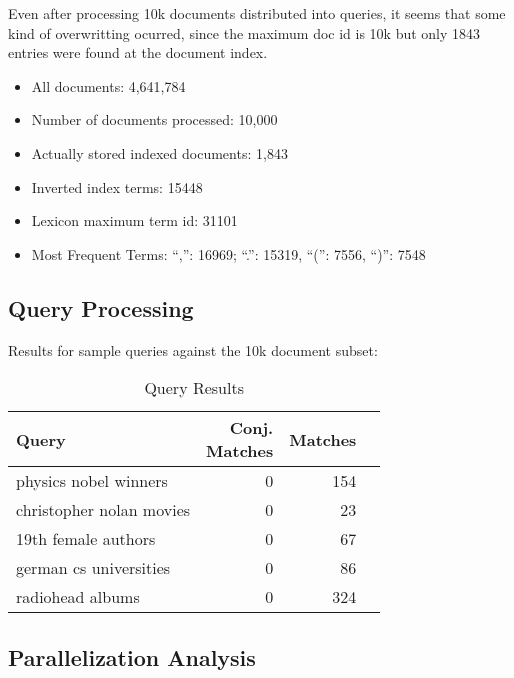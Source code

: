 Even after processing 10k documents distributed into queries, it seems that some kind of overwritting ocurred, since the maximum doc id is 10k but only 1843 entries were found at the document index.

\begin{itemize}
  \item All documents: 4,641,784
  \item Number of documents processed: 10,000
  \item Actually stored indexed documents: 1,843
  \item Inverted index terms: 15448
  \item Lexicon maximum term id: 31101
  \item Most Frequent Terms: ``,'': 16969; ``.'': 15319, ``('': 7556, ``)'': 7548
\end{itemize}

\subsection{Query Processing}

Results for sample queries against the 10k document subset:

\begin{table}[htbp]
  \caption{Query Results}
  \label{tab:query-results}
  \begin{tabular}{lrrr}
    \toprule
    \textbf{Query}           & \shortstack{\textbf{Conj.}       \\\textbf{Matches}} & \textbf{Matches} \\
    \midrule
    physics nobel winners    & 0                          & 154 \\
    christopher nolan movies & 0                          & 23  \\
    19th female authors      & 0                          & 67  \\
    german cs universities   & 0                          & 86  \\
    radiohead albums         & 0                          & 324 \\
    \bottomrule
  \end{tabular}
\end{table}

\subsection{Parallelization Analysis} \label{subsec:parallelization}

